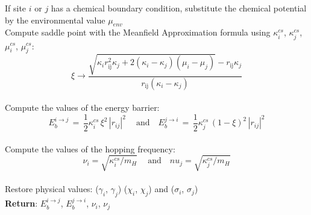 \documentclass{article}
\begin{document}
\begin{algorithm}
\begin{algorithmic}
    \State If site $i$ or $j$ has a chemical boundary condition, substitute the chemical potential by the environmental value $\mu_{env}$\\
    
    \State Compute saddle point with the Meanfield Approximation formula using $\kappa_i^{cs}$, $\kappa_j^{cs}$, $\mu_i^{cs}$, $\mu_j^{cs}$:
    \begin{equation*}
    \xi \to \frac{\sqrt{\kappa _i r_{\text{ij}}^2 \kappa _j+2 \left(\kappa _i-\kappa _j\right) \left(\mu _i-\mu _j\right)}-r_{\text{ij}} \kappa _j}{r_{\text{ij}} \left(\kappa _i-\kappa _j\right)}
    \end{equation*}\\
    
    \State Compute the values of the energy barrier:
    \begin{equation*}
        E_b^{i \rightarrow j}\, =\, \frac{1}{2} \kappa^{cs}_i\, \xi^2\, |r_{ij}|^2\ \quad \text{and} \quad E_b^{j \rightarrow i}\, =\, \frac{1}{2} \kappa^{cs}_j\, (1 - \xi)^2\, |r_{ij}|^2
    \end{equation*}\\
    
    \State Compute the values of the hopping frequency:
    \begin{equation*}
        \nu_i = \sqrt{\kappa_i^{cs}/m_H}\ \quad \text{and} \quad nu_j = \sqrt{\kappa_j^{cs}/m_H} 
    \end{equation*}\\
    
    \State Restore physical values: ($\gamma_i$, $\gamma_j$) ($\chi_i$, $\chi_j$) and ($\sigma_i$, $\sigma_j$)\\
    
    \State \textbf{Return}: $E_b^{i \rightarrow j}$, $E_b^{j \rightarrow i}$, $\nu_i$, $\nu_j$
    
    \end{algorithmic}
    \end{algorithm}
    
    
\end{document}
